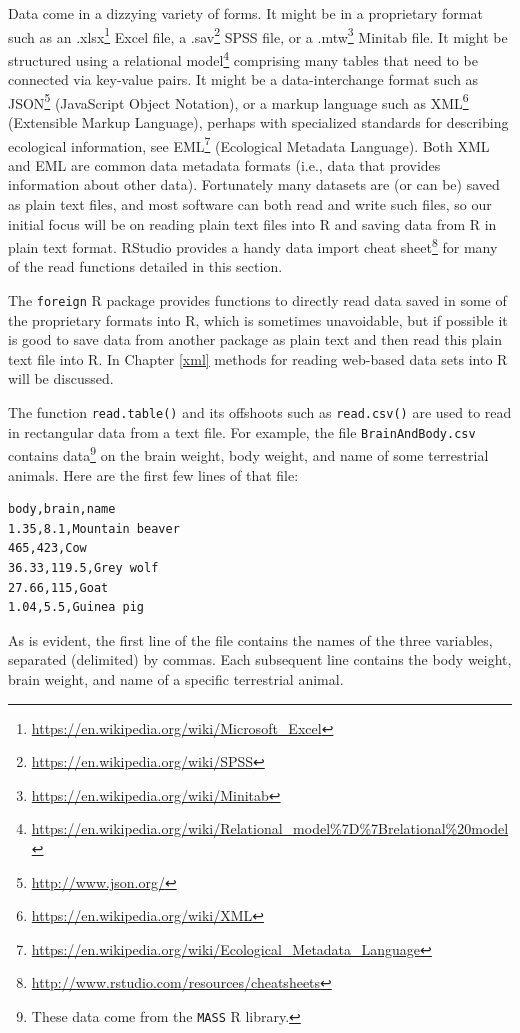\documentclass[]{krantz}
\renewcommand{\href}[2]{#2\footnote{\url{#1}}}
\begin{document}
Data come in a dizzying variety of forms. It might be in a proprietary
format such as an
\href{https://en.wikipedia.org/wiki/Microsoft_Excel}{.xlsx} Excel file,
a \href{https://en.wikipedia.org/wiki/SPSS}{.sav} SPSS file, or a
\href{https://en.wikipedia.org/wiki/Minitab}{.mtw} Minitab file. It
might be structured using a
\href{https://en.wikipedia.org/wiki/Relational_model\%7D\%7Brelational\%20model}{relational
model} comprising many tables that need to be connected via key-value
pairs. It might be a data-interchange format such as
\href{http://www.json.org/}{JSON} (JavaScript Object Notation), or a
markup language such as \href{https://en.wikipedia.org/wiki/XML}{XML}
(Extensible Markup Language), perhaps with specialized standards for
describing ecological information, see
\href{https://en.wikipedia.org/wiki/Ecological_Metadata_Language}{EML}
(Ecological Metadata Language). Both XML and EML are common data
metadata formats (i.e., data that provides information about other
data). Fortunately many datasets are (or can be) saved as plain text
files, and most software can both read and write such files, so our
initial focus will be on reading plain text files into R and saving data
from R in plain text format. RStudio provides a handy
\href{http://www.rstudio.com/resources/cheatsheets}{data import cheat
sheet} for many of the read functions detailed in this section.

The \texttt{foreign} R package provides functions to directly read data
saved in some of the proprietary formats into R, which is sometimes
unavoidable, but if possible it is good to save data from another
package as plain text and then read this plain text file into R. In
Chapter \ref{xml} methods for reading web-based data sets into R will be
discussed.

The function \texttt{read.table()} and its offshoots such as
\texttt{read.csv()} are used to read in rectangular data from a text
file. For example, the file \texttt{BrainAndBody.csv} contains
data\footnote{These data come from the \texttt{MASS} R library.} on the
brain weight, body weight, and name of some terrestrial animals. Here
are the first few lines of that file:

\begin{verbatim}
body,brain,name
1.35,8.1,Mountain beaver
465,423,Cow
36.33,119.5,Grey wolf
27.66,115,Goat
1.04,5.5,Guinea pig
\end{verbatim}

As is evident, the first line of the file contains the names of the
three variables, separated (delimited) by commas. Each subsequent line
contains the body weight, brain weight, and name of a specific
terrestrial animal.
\end{document}
